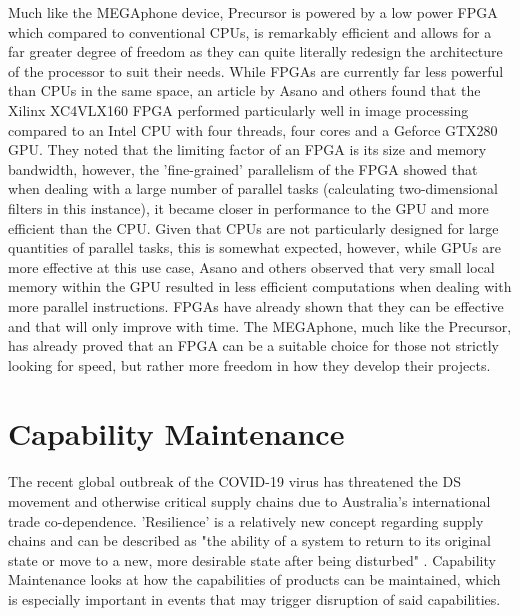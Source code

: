 Much like the MEGAphone device, Precursor is powered by a low power FPGA which compared to conventional CPUs, is remarkably efficient and allows for a far greater degree of freedom as they can quite literally redesign the architecture of the processor to suit their needs.
While FPGAs are currently far less powerful than CPUs in the same space, an article by Asano and others \cite{fpga} found that the Xilinx XC4VLX160 FPGA performed particularly well in image processing compared to an Intel CPU with four threads, four cores and a Geforce GTX280 GPU.
They noted that the limiting factor of an FPGA is its size and memory bandwidth, however, the 'fine-grained' parallelism of the FPGA showed that when dealing with a large number of parallel tasks (calculating two-dimensional filters in this instance), it became closer in performance to the GPU and more efficient than the CPU.
Given that CPUs are not particularly designed for large quantities of parallel tasks, this is somewhat expected, however, while GPUs are more effective at this use case, Asano and others observed that very small local memory within the GPU resulted in less efficient computations when dealing with more parallel instructions.
FPGAs have already shown that they can be effective and that will only improve with time.
The MEGAphone, much like the Precursor, has already proved that an FPGA can be a suitable choice for those not strictly looking for speed, but rather more freedom in how they develop their projects.

\section{Capability Maintenance}
The recent global outbreak of the COVID-19 virus has threatened the DS movement and otherwise critical supply chains due to Australia's international trade co-dependence.
'Resilience' is a relatively new concept regarding supply chains and can be described as "the ability of a system to return to its original state or move to a new, more desirable state after being disturbed" \cite{supply}.
Capability Maintenance looks at how the capabilities of products can be maintained, which is especially important in events that may trigger disruption of said capabilities.

